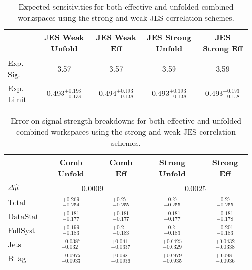\begin{table}[!htbp]\captionsetup{justification=centering}
\caption{Expected sensitivities for both effective and unfolded combined workspaces using the strong and weak JES correlation schemes.}
\begin{center}\begin{tabular}{lcccc}
\hline\hline
 & JES Weak Unfold & JES Weak Eff & JES Strong Unfold & JES Strong Eff\\
\hline
Exp. Sig. & 3.57 & 3.57 & 3.59 & 3.59\\
\hline
Exp. Limit & $0.493^{+0.193}_{-0.138}$ & $0.494^{+0.193}_{-0.138}$ & $0.493^{+0.193}_{-0.138}$ & $0.493^{+0.193}_{-0.138}$\\
\hline\hline
\end{tabular}
\label{tab:sw_jes_sensitivities}
\end{center}
\end{table}

\begin{table}[!htbp]\captionsetup{justification=centering}
\caption{Error on signal strength breakdowns for both effective and unfolded combined workspaces using the strong and weak JES correlation schemes.}
\begin{center}\begin{tabular}{lcccc}
\hline
 & Comb Unfold & Comb Eff & Strong Unfold & Strong Eff\\
\hline\hline
$\Delta\hat{\mu}$ &  \multicolumn{2}{|c|}{0.0009} &  \multicolumn{2}{|c|}{0.0025}\\
\hline
Total &  $^{+ 0.269}_{-0.254}$ &  $^{+ 0.27}_{-0.255}$ &  $^{+ 0.27}_{-0.255}$ &  $^{+ 0.27}_{-0.255}$\\
\hline
DataStat &  $^{+ 0.181}_{-0.177}$ &  $^{+ 0.181}_{-0.177}$ &  $^{+ 0.181}_{-0.177}$ &  $^{+ 0.181}_{-0.178}$\\
\hline
FullSyst &  $^{+ 0.199}_{-0.183}$ &  $^{+ 0.2}_{-0.183}$ &  $^{+ 0.2}_{-0.183}$ &  $^{+ 0.201}_{-0.183}$\\
\hline
Jets &  $^{+ 0.0387}_{-0.032}$ &  $^{+ 0.041}_{-0.0337}$ &  $^{+ 0.0425}_{-0.0329}$ &  $^{+ 0.0432}_{-0.0338}$\\
\hline
BTag &  $^{+ 0.0975}_{-0.0933}$ &  $^{+ 0.098}_{-0.0936}$ &  $^{+ 0.0979}_{-0.0935}$ &  $^{+ 0.098}_{-0.0936}$\\
\hline\hline
\end{tabular}

\label{tab:sw_jes_breakdowns}\end{center}
\end{table}

